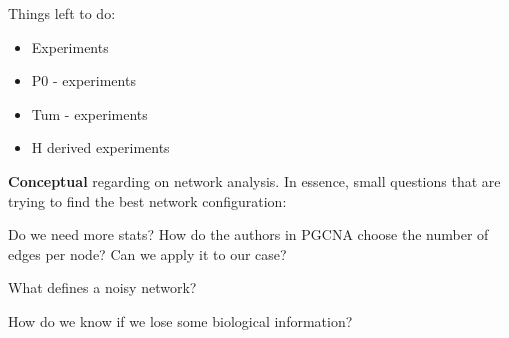 Things left to do:
\begin{itemize}
    \item Experiments 
    \item P0 - experiments
    \item Tum - experiments
    \item H derived experiments
\end{itemize}
\vspace{1cm}
\textbf{Conceptual} regarding on network analysis. In essence, small questions that are trying to find the best network configuration:
\begin{todolist}
    \item Do we need more stats? How do the authors in PGCNA choose the number of edges per node? Can we apply it to our case?
    \item What defines a noisy network?
    \item How do we know if we lose some biological information?
\end{todolist}
